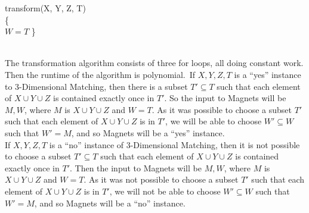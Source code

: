 \documentclass{assignment}
\begin{document}
\begin{problemlist}
\begin{answer}
\IncMargin{3em}
\begin{algorithm}
  transform(X, Y, Z, T)\\\{\\
  \Indp
  $W = T$
  \;
  \Indm
  \}
\end{algorithm}
\DecMargin{3em}\\
The transformation algorithm consists of three for loops, all doing constant work. Then the runtime of the algorithm is polynomial.\
If $X, Y, Z, T$ is a ``yes'' instance to 3-Dimensional Matching, then there is a subset $T'\subseteq T$ such that each element of $X\cup Y\cup Z$ is contained exactly once in $T'$. So the input to Magnets will be $M, W$, where $M$ is $X\cup Y\cup Z$ and $W = T$. As it was possible to choose a subset $T'$ such that each element of $X\cup Y\cup Z$ is in $T'$, we will be able to choose $W'\subseteq W$ such that $W'=M$, and so Magnets will be a ``yes'' instance.\\
If $X, Y, Z, T$ is a ``no'' instance of 3-Dimensional Matching, then it is not possible to choose a subset $T'\subseteq T$ such that each element of $X\cup Y\cup Z$ is contained exactly once in $T'$. Then the input to Magnets will be $M, W$, where $M$ is $X\cup Y\cup Z$ and $W = T$. As it was not possible to choose a subset $T'$ such that each element of $X\cup Y\cup Z$ is in $T'$, we will not be able to choose $W'\subseteq W$ such that $W'=M$, and so Magnets will be a ``no'' instance.\\
\end{answer}

\end{problemlist}
\end{document}
